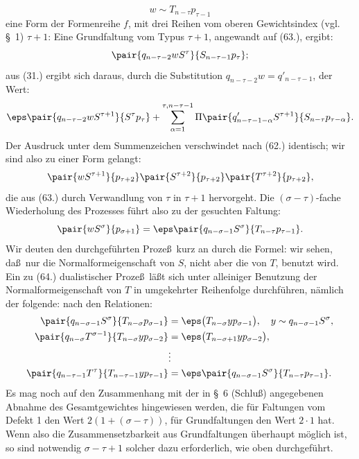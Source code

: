 \[
 w\sim T_{n-\tau}p_{\tau-1}
\]
eine Form der Formenreihe $f$, mit drei Reihen vom oberen Gewichtsindex (vgl. \S\ 1) $\tau+1$:
Eine Grundfaltung vom Typus $\tau+1$, angewandt auf (63.), ergibt:
\[
 \pair{q_{n-\tau-2}wS^\tau}{S_{n-\tau-1}p_\tau};
\]
aus (31.) ergibt sich daraus, durch die Substitution $q_{n-\tau-2}w=q'_{n-\tau-1}$, der Wert:
\[
 \eps\pair{q_{n-\tau-2}wS^{\tau+1}}{S^\tau p_\tau}
 +\sum_{\alpha=1}^{\tau,n-\tau-1}\Pi\pair{q'_{n-\tau-1-\alpha}S^{\tau+1}}{S_{n-\tau}p_{\tau-\alpha}}.
\]
Der Ausdruck unter dem Summenzeichen verschwindet nach (62.) identisch; wir sind also zu einer Form gelangt:
\[
 \pair{wS^{\tau+1}}{p_{\tau+2}}\pair{S^{\tau+2}}{p_{\tau+2}}\pair{T^{\tau+2}}{p_{\tau+2}},
\]
die aus (63.) durch Verwandlung von $\tau$ in $\tau+1$ hervorgeht. Die $(\sigma-\tau)$-fache Wiederholung des Prozesses f\"uhrt also zu der gesuchten Faltung:
\[
 \pair{wS^\sigma}{p_{\sigma+1}}=\eps\pair{q_{n-\sigma-1}S^\sigma}{T_{n-\tau}p_{\tau-1}}.
\]
Wir deuten den durchgef\"uhrten Proze\ss\ kurz an durch die Formel:
wir sehen, da\ss\ nur die Normalformeigenschaft von $S$, nicht aber die von $T$, benutzt wird. Ein zu (64.) dualistischer Proze\ss\ l\"a\ss t sich unter alleiniger Benutzung der Normalformeigenschaft von $T$ in umgekehrter Reihenfolge durchf\"uhren, n\"amlich der folgende:
nach den Relationen:
\begin{align*}
\pair{q_{n-\sigma-1}S^\sigma}{T_{n-\sigma}p_{\sigma-1}}&=\eps\bigl(T_{n-\sigma}y p_{\sigma-1}\bigr),\quad y\sim q_{n-\sigma-1}S^\sigma,\\
\pair{q_{n-\sigma}T^{\sigma-1}}{T_{n-\sigma}yp_{\sigma-2}}&=\eps\bigl(T_{n-\sigma+1}y p_{\sigma-2}\bigr),\\
&\vdots\\
\pair{q_{n-\tau-1}T^\tau}{T_{n-\tau-1}yp_{\tau-1}}&=\eps\pair{q_{n-\sigma-1}S^\sigma}{T_{n-\tau}p_{\tau-1}}.
\end{align*}
Es mag noch auf den Zusammenhang mit der in \S\ 6 (Schlu\ss) angegebenen Abnahme des Gesamtgewichtes hingewiesen werden, die f\"ur Faltungen vom Defekt 1 den Wert $2(1+(\sigma-\tau))$, f\"ur Grundfaltungen den Wert $2\cdot1$ hat. Wenn also die Zusammensetzbarkeit aus Grundfaltungen \"uberhaupt m\"oglich ist, so sind notwendig $\sigma-\tau+1$ solcher dazu erforderlich, wie oben durchgef\"uhrt.

